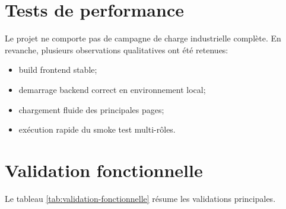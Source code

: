 \section{Tests de performance}
Le projet ne comporte pas de campagne de charge industrielle complète. En revanche, plusieurs observations qualitatives ont été retenues:
\begin{itemize}
  \item build frontend stable;
  \item demarrage backend correct en environnement local;
  \item chargement fluide des principales pages;
  \item exécution rapide du smoke test multi-rôles.
\end{itemize}

\section{Validation fonctionnelle}
Le tableau \ref{tab:validation-fonctionnelle} résume les validations principales.

